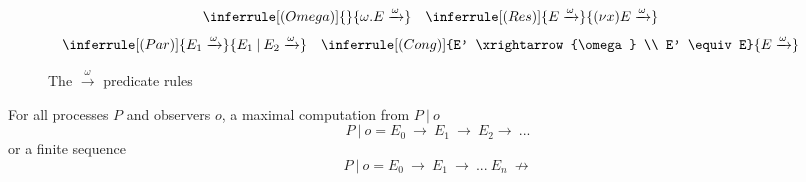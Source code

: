 \begin{figure}[h]
    \centering
    \begin{align*}
        &\inferrule[(Omega)]{ }{\omega.E \xrightarrow{\omega}} &
        & \inferrule[(Res)]{E \xrightarrow{\omega}}{(\nu x)E \xrightarrow{\omega}}
    \end{align*}
    \begin{align*}
        &\inferrule[(Par)]{E_1 \xrightarrow{\omega}}{E_1 \: | \: E_2 \xrightarrow{\omega}} & 
        & \inferrule[(Cong)]{E' \xrightarrow{\omega} \\ E' \equiv E}{E \xrightarrow{\omega}}
    \end{align*}
    \caption{The $\xrightarrow{\omega}$ predicate rules}
    \label{fig:successRelation}
\end{figure}

\begin{definition}
    For all processes $P$ and observers $o$, a maximal computation from $P \: | \: o$
    \begin{equation*}
        P \: | \: o = E_0 \:\rightarrow\: E_1 \: \rightarrow \: E_2 \rightarrow \: ...
    \end{equation*}
    or a finite sequence
    \begin{equation*}
        P \: | \: o = E_0 \: \rightarrow \: E_1 \: \rightarrow \: ... \: E_n \: \not \rightarrow
    \end{equation*}
    \label{MaximalComp}
\end{definition}




